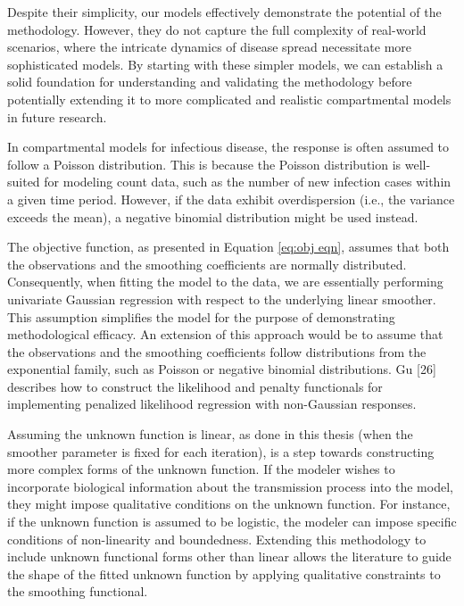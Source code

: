 \documentclass[
11pt, %
oneside, %
english, %
singlespacing, %
]{macthesis} %
\begin{document}
Despite their simplicity, our models effectively demonstrate the potential of the methodology. However, they do not capture the full complexity of real-world scenarios, where the intricate dynamics of disease spread necessitate more sophisticated models. By starting with these simpler models, we can establish a solid foundation for understanding and validating the methodology before potentially extending it to more complicated and realistic compartmental models in future research.

In compartmental models for infectious disease, the response is often assumed to follow a Poisson distribution. This is because the Poisson distribution is well-suited for modeling count data, such as the number of new infection cases within a given time period. However, if the data exhibit overdispersion (i.e., the variance exceeds the mean), a negative binomial distribution might be used instead.

The objective function, as presented in Equation \ref{eq:obj eqn}, assumes that both the observations and the smoothing coefficients are normally distributed. Consequently, when fitting the model to the data, we are essentially performing univariate Gaussian regression with respect to the underlying linear smoother. This assumption simplifies the model for the purpose of demonstrating methodological efficacy. An extension of this approach would be to assume that the observations and the smoothing coefficients follow distributions from the exponential family, such as Poisson or negative binomial distributions. Gu {[}26{]} describes how to construct the likelihood and penalty functionals for implementing penalized likelihood regression with non-Gaussian responses.

Assuming the unknown function is linear, as done in this thesis (when the smoother parameter is fixed for each iteration), is a step towards constructing more complex forms of the unknown function. If the modeler wishes to incorporate biological information about the transmission process into the model, they might impose qualitative conditions on the unknown function. For instance, if the unknown function is assumed to be logistic, the modeler can impose specific conditions of non-linearity and boundedness. Extending this methodology to include unknown functional forms other than linear allows the literature to guide the shape of the fitted unknown function by applying qualitative constraints to the smoothing functional.
\end{document}
